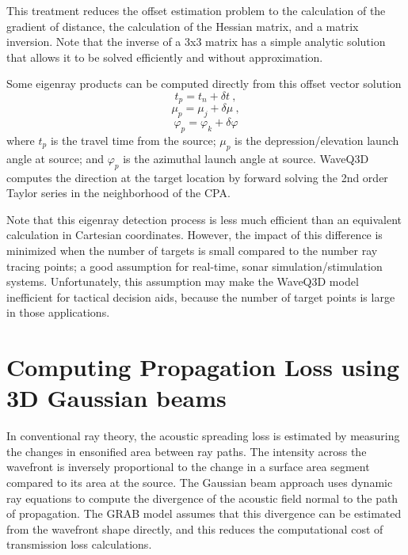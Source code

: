 \documentclass{ws-jca}
\newcommand{\threeD}{3\nobreakdash\textendash D }	%
\begin{document}
This treatment reduces the offset estimation problem to the calculation of
the gradient of distance, the calculation of the Hessian matrix, and a
matrix inversion. Note that the inverse of a 3x3 matrix has a simple
analytic solution that allows it to be solved efficiently and without
approximation.

Some eigenray products can be computed directly from this offset vector
solution
\begin{equation}
	t_p = t_n + \delta t \:,
	\label{eq:delta_t}
\end{equation}
\begin{equation}
	\mu_p = \mu_j + \delta \mu \:,
	\label{eq:delta_mu}
\end{equation}
\begin{equation}
	\varphi_p = \varphi_k + \delta \varphi
	\label{eq:delta_varphi}
\end{equation}
where 
\(t_p\) is the travel time from the source;
\(\mu_p\) is the depression/elevation launch angle at source; and
\(\varphi_p\) is the azimuthal launch angle at source.
WaveQ3D computes the direction at the target location by forward solving the 2nd
order Taylor series in the neighborhood of the CPA.

Note that this eigenray detection process is less much efficient than an equivalent
calculation in Cartesian coordinates. However, the impact of this
difference is minimized when the number of targets is small compared to the
number ray tracing points; a good assumption for real-time, sonar
simulation/stimulation systems. Unfortunately, this assumption may make the WaveQ3D model
inefficient for tactical decision aids, because the number of target points
is large in those applications.

\section{Computing Propagation Loss using \threeD Gaussian beams}

In conventional ray theory, the acoustic spreading loss is estimated by
measuring the changes in ensonified area between ray paths. The intensity
across the wavefront is inversely proportional to the change in a surface
area segment compared to its area at the source. The Gaussian beam approach uses
dynamic ray equations to compute the divergence of the acoustic field
normal to the path of propagation. 
The GRAB model assumes that this divergence can be estimated from the wavefront
shape directly, and this reduces the computational cost of transmission loss calculations.
\end{document}
